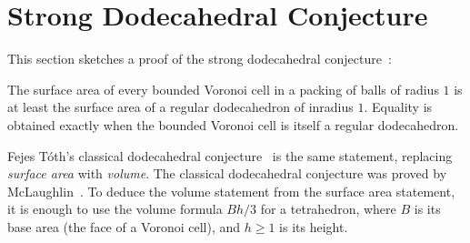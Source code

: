 \documentclass{llncs}
\begin{document}
\section{Strong Dodecahedral Conjecture}

This section sketches a proof of the strong dodecahedral
conjecture~\cite{Bezdek00}:

\begin{theorem}
  The surface area of every bounded Voronoi cell in a packing of balls
  of radius $1$ is at least the surface area of a regular dodecahedron
  of inradius $1$.  Equality is obtained exactly when the bounded
  Voronoi cell is itself a regular dodecahedron.
\end{theorem}

\begin{remark} Fejes T\'oth's classical dodecahedral
  conjecture~\cite{Toth:1943:MZ} is the same statement, replacing {\it
    surface area} with {\it volume}.  The classical dodecahedral
  conjecture was proved by McLaughlin~\cite{Hales:2010:Dodec}.  To
  deduce the volume statement from the surface area statement, it is
  enough to use the volume formula $B h/3$ for a tetrahedron, where
  $B$ is its base area (the face of a Voronoi cell), and $h\ge 1$ is
  its height.
\end{remark}
\end{document}
